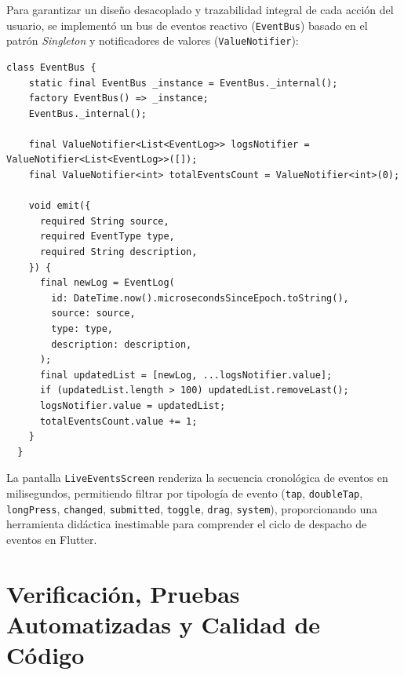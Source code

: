 \documentclass[12pt,a4paper]{article}
\begin{document}
  Para garantizar un diseño desacoplado y trazabilidad integral de cada acción del usuario, se implementó un bus de eventos reactivo (\texttt{EventBus}) basado en el patrón \textit{Singleton} y notificadores de valores (\texttt{ValueNotifier}):

  \begin{lstlisting}[caption={Implementación del Singleton EventBus}]
  class EventBus {
    static final EventBus _instance = EventBus._internal();
    factory EventBus() => _instance;
    EventBus._internal();

    final ValueNotifier<List<EventLog>> logsNotifier = ValueNotifier<List<EventLog>>([]);
    final ValueNotifier<int> totalEventsCount = ValueNotifier<int>(0);

    void emit({
      required String source,
      required EventType type,
      required String description,
    }) {
      final newLog = EventLog(
        id: DateTime.now().microsecondsSinceEpoch.toString(),
        source: source,
        type: type,
        description: description,
      );
      final updatedList = [newLog, ...logsNotifier.value];
      if (updatedList.length > 100) updatedList.removeLast();
      logsNotifier.value = updatedList;
      totalEventsCount.value += 1;
    }
  }
  \end{lstlisting}

  La pantalla \texttt{LiveEventsScreen} renderiza la secuencia cronológica de eventos en milisegundos, permitiendo filtrar por tipología de evento (\texttt{tap}, \texttt{doubleTap}, \texttt{longPress}, \texttt{changed}, \texttt{submitted}, \texttt{toggle}, \texttt{drag}, \texttt{system}), proporcionando una herramienta didáctica inestimable para comprender el ciclo de despacho de eventos en Flutter.

  \section{Verificación, Pruebas Automatizadas y Calidad de Código}
\end{document}
